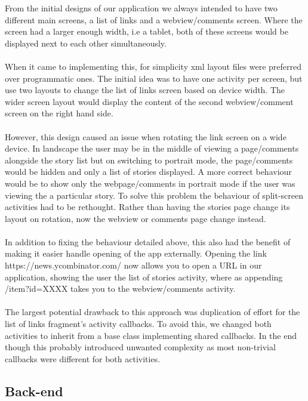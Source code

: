\documentclass[11pt]{article}
\begin{document}
From the initial designs of our application we always intended to have two different main screens, a list of links and a webview/comments screen. Where the screen had a larger enough width, i.e a tablet, both of these screens would be displayed next to each other simultaneously.
\\
\\
When it came to implementing this, for simplicity xml layout files were preferred over programmatic ones. The initial idea was to have one activity per screen, but use two layouts to change the list of links screen based on device width. The wider screen layout would display the content of the second webview/comment screen on the right hand side.
\\
\\
However, this design caused an issue when rotating the link screen on a wide device. In landscape the user may be in the middle of viewing a page/comments alongside the story list but on switching to portrait mode, the page/comments would be hidden and only a list of stories displayed. A more correct behaviour would be to show only the webpage/comments in portrait mode if the user was viewing the a particular story. To solve this problem the behaviour of split-screen activities had to be rethought. Rather than having the stories page change its layout on rotation, now the webview or comments page change instead.
\\
\\
In addition to fixing the behaviour detailed above, this also had the benefit of making it easier handle opening of the app externally. Opening the link https://news.ycombinator.com/ now allows you to open a URL in our application, showing the user the list of stories activity, where as appending /item?id=XXXX takes you to the webview/comments activity. 
\\
\\
The largest potential drawback to this approach was duplication of effort for the list of links fragment’s activity callbacks. To avoid this, we changed both activities to inherit from a base class implementing shared callbacks. In the end though this probably introduced unwanted complexity as most non-trivial callbacks were different for both activities.

\subsection*{Back-end}
\end{document}
